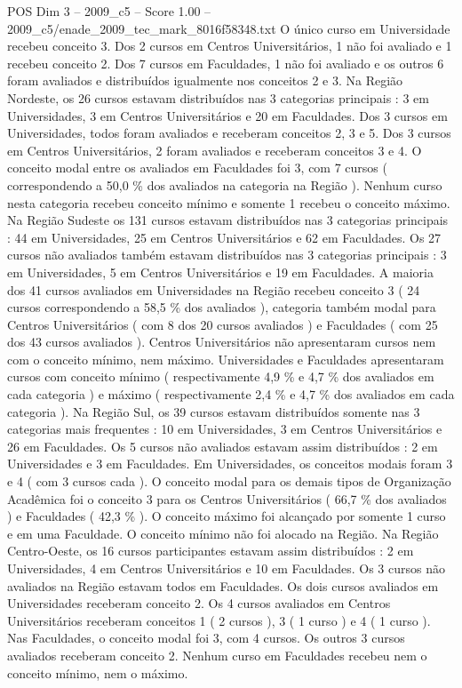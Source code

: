 \begin{textsample}{POS Dim 3 – 2009\_c5 – Score 1.00 – 2009\_c5/enade\_2009\_tec\_mark\_8016f58348.txt}
O único curso em Universidade recebeu conceito 3.
Dos 2 cursos em Centros Universitários, 1 não foi avaliado e 1 recebeu conceito 2.
Dos 7 cursos em Faculdades, 1 não foi avaliado e os outros 6 foram avaliados e distribuídos igualmente nos conceitos 2 e 3.
Na Região Nordeste, os 26 cursos estavam distribuídos nas 3 categorias principais : 3 em Universidades, 3 em Centros Universitários e 20 em Faculdades.
Dos 3 cursos em Universidades, todos foram avaliados e receberam conceitos 2, 3 e 5.
Dos 3 cursos em Centros Universitários, 2 foram avaliados e receberam conceitos 3 e 4.
O conceito modal entre os avaliados em Faculdades foi 3, com 7 cursos ( correspondendo a 50,0 \% dos avaliados na categoria na Região ).
Nenhum curso nesta categoria recebeu conceito mínimo e somente 1 recebeu o conceito máximo.
Na Região Sudeste os 131 cursos estavam distribuídos nas 3 categorias principais : 44 em Universidades, 25 em Centros Universitários e 62 em Faculdades.
Os 27 cursos não avaliados também estavam distribuídos nas 3 categorias principais : 3 em Universidades, 5 em Centros Universitários e 19 em Faculdades.
A maioria dos 41 cursos avaliados em Universidades na Região recebeu conceito 3 ( 24 cursos correspondendo a 58,5 \% dos avaliados ), categoria também modal para Centros Universitários ( com 8 dos 20 cursos avaliados ) e Faculdades ( com 25 dos 43 cursos avaliados ).
Centros Universitários não apresentaram cursos nem com o conceito mínimo, nem máximo.
Universidades e Faculdades apresentaram cursos com conceito mínimo ( respectivamente 4,9 \% e 4,7 \% dos avaliados em cada categoria ) e máximo ( respectivamente 2,4 \% e 4,7 \% dos avaliados em cada categoria ).
Na Região Sul, os 39 cursos estavam distribuídos somente nas 3 categorias mais frequentes : 10 em Universidades, 3 em Centros Universitários e 26 em Faculdades.
Os 5 cursos não avaliados estavam assim distribuídos : 2 em Universidades e 3 em Faculdades.
Em Universidades, os conceitos modais foram 3 e 4 ( com 3 cursos cada ).
O conceito modal para os demais tipos de Organização Acadêmica foi o conceito 3 para os Centros Universitários ( 66,7 \% dos avaliados ) e Faculdades ( 42,3 \% ).
O conceito máximo foi alcançado por somente 1 curso e em uma Faculdade.
O conceito mínimo não foi alocado na Região.
Na Região Centro-Oeste, os 16 cursos participantes estavam assim distribuídos : 2 em Universidades, 4 em Centros Universitários e 10 em Faculdades.
Os 3 cursos não avaliados na Região estavam todos em Faculdades.
Os dois cursos avaliados em Universidades receberam conceito 2.
Os 4 cursos avaliados em Centros Universitários receberam conceitos 1 ( 2 cursos ), 3 ( 1 curso ) e 4 ( 1 curso ).
Nas Faculdades, o conceito modal foi 3, com 4 cursos.
Os outros 3 cursos avaliados receberam conceito 2.
Nenhum curso em Faculdades recebeu nem o conceito mínimo, nem o máximo.

\end{textsample}
